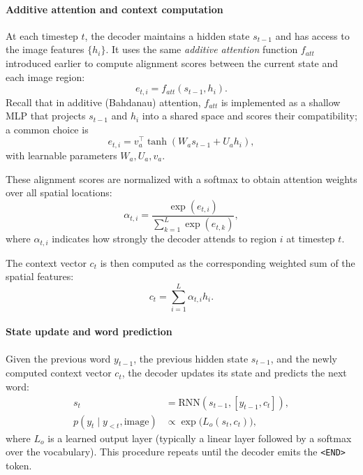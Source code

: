 \paragraph{Additive attention and context computation}

At each timestep \(t\), the decoder maintains a hidden state \(s_{t-1}\) and has access to the image features \(\{h_i\}\).
It uses the same \emph{additive attention} function \(f_{att}\) introduced earlier to compute alignment scores between the current state and each image region:
\begin{equation}
	e_{t,i} = f_{att}(s_{t-1}, h_i).
\end{equation}
Recall that in additive (Bahdanau) attention, \(f_{att}\) is implemented as a shallow MLP that projects \(s_{t-1}\) and \(h_i\) into a shared space and scores their compatibility; a common choice is
\begin{equation}
	e_{t,i} = v_a^{\top} \tanh(W_a s_{t-1} + U_a h_i),
\end{equation}
with learnable parameters \(W_a, U_a, v_a\).

These alignment scores are normalized with a softmax to obtain attention weights over all spatial locations:
\begin{equation}
	\alpha_{t,i} = \frac{\exp(e_{t,i})}{\sum_{k=1}^{L} \exp(e_{t,k})},
\end{equation}
where \(\alpha_{t,i}\) indicates how strongly the decoder attends to region \(i\) at timestep \(t\).

The context vector \(c_t\) is then computed as the corresponding weighted sum of the spatial features:
\begin{equation}
	c_t = \sum_{i=1}^{L} \alpha_{t,i} h_i.
\end{equation}

\paragraph{State update and word prediction}

Given the previous word \(y_{t-1}\), the previous hidden state \(s_{t-1}\), and the newly computed context vector \(c_t\), the decoder updates its state and predicts the next word:
\begin{align}
	s_t &= \text{RNN}(s_{t-1}, [y_{t-1}, c_t]), \\
	p(y_t \mid y_{<t}, \text{image}) &\propto \exp\big(L_o(s_t, c_t)\big),
\end{align}
where \(L_o\) is a learned output layer (typically a linear layer followed by a softmax over the vocabulary).
This procedure repeats until the decoder emits the \texttt{<END>} token.

